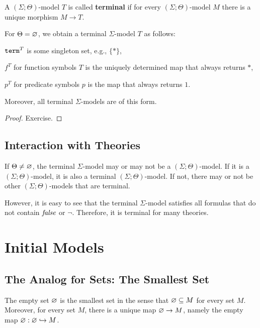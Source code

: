 \begin{definition}
A $(\Sigma;\Theta)$-model $T$ is called \textbf{terminal} if for every $(\Sigma;\Theta)$-model $M$ there is a unique morphism $M\to T$.
\end{definition}

\begin{theorem}
For $\Theta=\varnothing$, we obtain a terminal $\Sigma$-model $T$ as follows:
\begin{compactitem}
 \item $\mathtt{term}^T$ is some singleton set, e.g., $\{\ast\}$,
 \item $f^T$ for function symbols $T$ is the uniquely determined map that always returns $\ast$,
 \item $p^T$ for predicate symbols $p$ is the map that always returns $1$.
\end{compactitem}
Moreover, all terminal $\Sigma$-models are of this form.
\end{theorem}
\begin{proof}
Exercise.
\end{proof}

\subsection{Interaction with Theories}

If $\Theta\neq\varnothing$, the terminal $\Sigma$-model may or may not be a $(\Sigma;\Theta)$-model.
If it is a $(\Sigma;\Theta)$-model, it is also a terminal $(\Sigma;\Theta)$-model.
If not, there may or not be other $(\Sigma;\Theta)$-models that are terminal.

However, it is easy to see that the terminal $\Sigma$-model satisfies all formulas that do not contain $\mathit{false}$ or $\neg$.
Therefore, it is terminal for many theories.

\section{Initial Models}\label{sec:univ:init}

\subsection{The Analog for Sets: The Smallest Set}

The empty set $\varnothing$ is the smallest set in the sense that $\varnothing\subseteq M$ for every set $M$.
Moreover, for every set $M$, there is a unique map $\varnothing\to M$, namely the empty map $\varnothing:\varnothing\hookrightarrow M$.

